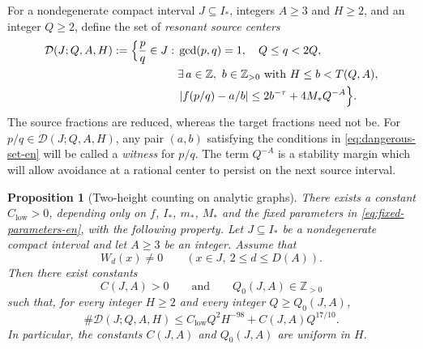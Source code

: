 \documentclass[11pt]{amsart}
\numberwithin{equation}{section}
\newtheorem{proposition}[proposition]{Proposition}
\theoremstyle{definition}
\theoremstyle{remark}
\newcommand{\Z}{\mathbb Z}
\newcommand{\abs}[1]{\left\lvert #1\right\rvert}
\begin{document}
For a nondegenerate compact interval $J\subseteq I_*$, integers
$A\geq3$ and $H\geq2$, and an integer $Q\geq2$, define the set of \textit{resonant source centers}
\begin{equation}\label{eq:dangerous-set-en}
\begin{split}
\mathcal D(J;Q,A,H)
:=
\Bigl\{\frac pq\in J:\;&
\gcd(p,q)=1,\quad Q\leq q<2Q,\\
&\exists\,a\in\Z,\ b\in\Z_{>0}
\text{ with }H\leq b<T(Q,A),\\
&\abs{f(p/q)-a/b}
\leq2b^{-\tau}+4M_*Q^{-A}
\Bigr\}.
\end{split}
\end{equation}
The source fractions are reduced, whereas the target fractions need not be.
For $p/q\in\mathcal D(J;Q,A,H)$, any pair $(a,b)$ satisfying the
conditions in \eqref{eq:dangerous-set-en} will be called a \emph{witness}
for $p/q$.
The term $Q^{-A}$ is a stability margin which will allow avoidance at a
rational center to persist on the next source interval.

\begin{proposition}[Two-height counting on analytic graphs]
\label{prop:scarcity-en}
There exists a constant $C_{\mathrm{low}}>0$, depending only on
$f$, $I_*$, $m_*$, $M_*$ and the fixed parameters in
\eqref{eq:fixed-parameters-en}, with the following property. Let
$J\subseteq I_*$ be a nondegenerate compact interval and let $A\geq3$
be an integer. Assume that
\begin{equation}\label{eq:wronskians-on-J-en}
W_d(x)\neq0
\qquad(x\in J,\ 2\leq d\leq D(A)).
\end{equation}
Then there exist constants
\[
C(J,A)>0
\qquad\text{and}\qquad
Q_0(J,A)\in\Z_{>0}
\]
such that, for every integer $H\geq2$ and every integer
$Q\geq Q_0(J,A)$,
\begin{equation}\label{eq:scarcity-bound-en}
\#\mathcal D(J;Q,A,H)
\leq
C_{\mathrm{low}}Q^2H^{-98}
+
C(J,A)Q^{17/10}.
\end{equation}
In particular, the constants $C(J,A)$ and $Q_0(J,A)$ are uniform in
$H$.
\end{proposition}
\end{document}
